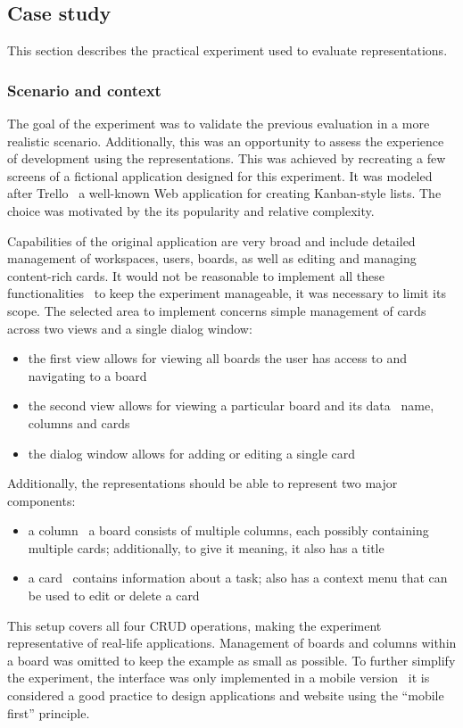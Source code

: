 \subsection{Case study}\label{subsec:case-study}
This section describes the practical experiment used to evaluate representations.

\subsubsection{Scenario and context}
The goal of the experiment was to validate the previous evaluation in a more realistic scenario.
Additionally, this was an opportunity to assess the experience of development using the representations.
This was achieved by recreating a few screens of a fictional application designed for this experiment.
It was modeled after Trello \textendash\ a well-known Web application for creating Kanban-style lists.
The choice was motivated by the its popularity and relative complexity.

Capabilities of the original application are very broad and include detailed management of workspaces, users, boards, as well as editing and managing content-rich cards.
It would not be reasonable to implement all these functionalities \textendash\ to keep the experiment manageable, it was necessary to limit its scope.
The selected area to implement concerns simple management of cards across two views and a single dialog window:
\begin{itemize}
    \item the first view allows for viewing all boards the user has access to and navigating to a board
    \item the second view allows for viewing a particular board and its data \textendash\ name, columns and cards
    \item the dialog window allows for adding or editing a single card
\end{itemize}
Additionally, the representations should be able to represent two major components:
\begin{itemize}
    \item a column \textendash\ a board consists of multiple columns, each possibly containing multiple cards; additionally, to give it meaning, it also has a title
    \item a card \textendash\ contains information about a task; also has a context menu that can be used to edit or delete a card
\end{itemize}
This setup covers all four CRUD operations, making the experiment representative of real-life applications.
Management of boards and columns within a board was omitted to keep the example as small as possible.
To further simplify the experiment, the interface was only implemented in a mobile version \textendash\ it is considered a good practice to design applications and website using the \enquote{mobile first} principle.

